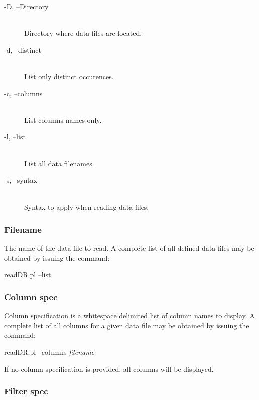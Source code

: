 \begin{description}

\item[-D, --Directory]%
%
\hfil\\
Directory where data files are located.

\item[-d, --distinct]%
%
\hfil\\
List only distinct occurences.

\item[-c, --columns]%
%
\hfil\\
List columns names only.

\item[-l, --list]%
%
\hfil\\
List all data filenames.

\item[-s, --syntax]%
%
\hfil\\
Syntax to apply when reading data files.

\end{description}

\subsubsection*{Filename}%

The name of the data file to read. A complete list of all defined data files may
be obtained by issuing the command:

readDR.pl --list

\subsubsection*{Column spec}%

Column specification is a whitespace delimited list of column names to display.
A complete list of all columns for a given data file may be obtained by issuing
the command:

readDR.pl --columns {\em filename\/}

If no column specification is provided, all columns will be displayed.

\subsubsection*{Filter spec}%

